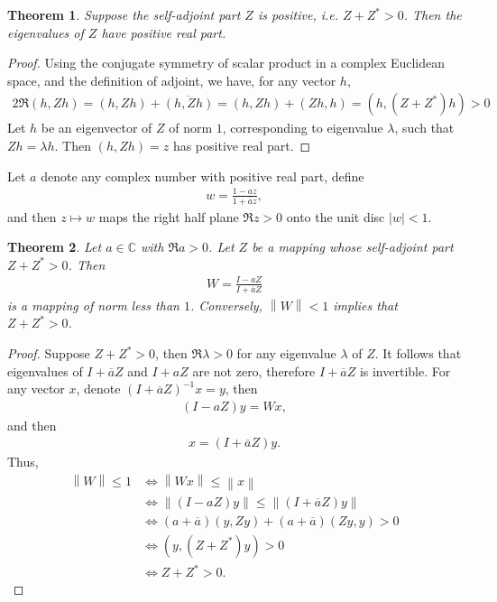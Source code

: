 \documentclass[11pt]{book}
\newtheorem{theorem}{Theorem}[chapter]
\theoremstyle{definition}
\numberwithin{equation}{chapter}
\begin{document}
\begin{theorem}
Suppose the self-adjoint part $Z$ is positive, i.e. $Z + Z^* > 0$. Then the eigenvalues of $Z$ have positive real part.
\end{theorem}
\begin{proof}
Using the conjugate symmetry of scalar product in a complex Euclidean space, and the definition of adjoint, we have, for any vector $h$,
\begin{align*}
    2 \Re (h, Zh) = (h, Zh) + \overline{(h, Zh)} = (h, Zh) + (Zh, h) = (h, (Z+Z^*)h) > 0
\end{align*}
Let $h$ be an eigenvector of $Z$ of norm $1$, corresponding to eigenvalue $\lambda$, such that $Zh = \lambda h$. Then $(h, Zh) = z$ has positive real part.
\end{proof}

\medskip

Let $a$ denote any complex number with positive real part, define
\begin{align*}
    w = \frac{1 - az}{1+\overline{a}z},
\end{align*}
and then $z \mapsto w$ maps the right half plane $\Re z > 0$ onto the unit disc $\left|w\right| < 1$. 

\medskip

\begin{theorem}
Let $a \in \mathbb{C}$ with $\Re a > 0$. Let $Z$ be a mapping whose self-adjoint part $Z + Z^* > 0$. Then
\begin{align*}
    W = \frac{I - aZ}{I + \overline{a}Z}
\end{align*}
is a mapping of norm less than $1$. Conversely, $\left\|W\right\| < 1$ implies that $Z + Z^* > 0$.
\end{theorem}
\begin{proof}
Suppose $Z + Z^* > 0$, then $\Re \lambda > 0$ for any eigenvalue $\lambda$ of $Z$. It follows that eigenvalues of $I + \overline{a} Z$ and $I + aZ$ are not zero, therefore $I + \overline{a} Z$ is invertible. For any vector $x$, denote $(I + \overline{a} Z)^{-1}x = y$, then \begin{align*}
    (I - aZ)y = Wx,
\end{align*}
and then 
\begin{align*}
    x = (I + \overline{a} Z)y.
\end{align*}
Thus,
\begin{align*}
    \left\|W\right\| \leq 1 & \Leftrightarrow \left\|Wx\right\| \leq \left\|x\right\| \\
    & \Leftrightarrow \left\|(I - aZ)y\right\| \leq \left\|(I + \overline{a} Z)y\right\| \\
    & \Leftrightarrow (a+\overline{a})(y,Zy) + (a+\overline{a})(Zy,y) > 0 \\
    & \Leftrightarrow (y, (Z+Z^*)y) > 0 \\
    & \Leftrightarrow Z+Z^* > 0.
\end{align*}
\end{proof}
\end{document}

